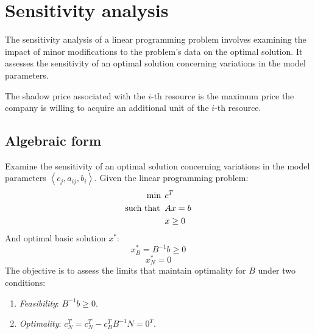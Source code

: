 \section{Sensitivity analysis}

The sensitivity analysis of a linear programming problem involves examining the impact of minor modifications to the problem's data on the optimal solution. 
It assesses the sensitivity of an optimal solution concerning variations in the model parameters.
\begin{definition}
    The shadow price associated with the $i$-th resource is the maximum price the company is willing to acquire an additional unit of the $i$-th resource.
\end{definition}

\subsection{Algebraic form}
Examine the sensitivity of an optimal solution concerning variations in the model parameters $\left\langle c_j, a_{ij}, b_i \right\rangle $.
Given the linear programming problem:
\begin{align*}
    \min                      \:&\: c^T            \\
    \textnormal{such that }     &\: Ax = b         \\
                                &\: x \geq 0
\end{align*}
And optimal basic solution $x^{*}$: 
\[x^{*}_B=B^{-1}b \geq 0\]
\[x^{*}_N=0\]
The objective is to assess the limits that maintain optimality for $B$ under two conditions:
\begin{enumerate}
  \item \textit{Feasibility}: $B^{-1} b \geq 0$.
  \item \textit{Optimality}: $c_N^T = c_N^T - c_B^T B^{-1} N = 0^T$.
\end{enumerate}

